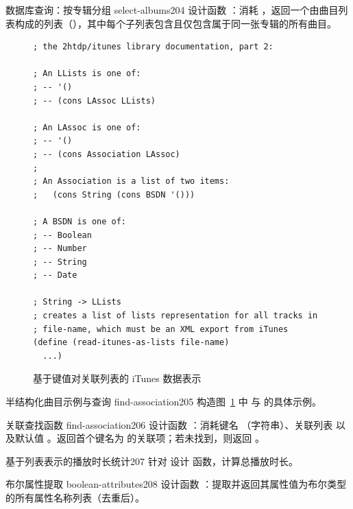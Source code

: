 \begin{exercise}{数据库查询：按专辑分组 select-albums}{204}
设计函数 ：消耗 ，返回一个由曲目列表构成的列表（），其中每个子列表包含且仅包含属于同一张专辑的所有曲目。
\end{exercise}

\begin{figure}[htbp]
  \centering
\begin{lstlisting}[language=BSL, basicstyle=\scriptsize\ttfamily]
; the 2htdp/itunes library documentation, part 2:

; An LLists is one of:
; -- '()
; -- (cons LAssoc LLists)

; An LAssoc is one of:
; -- '()
; -- (cons Association LAssoc)
;
; An Association is a list of two items:
;   (cons String (cons BSDN '()))

; A BSDN is one of:
; -- Boolean
; -- Number
; -- String
; -- Date

; String -> LLists
; creates a list of lists representation for all tracks in
; file-name, which must be an XML export from iTunes
(define (read-itunes-as-lists file-name)
  ...)
\end{lstlisting}
  \caption{基于键值对关联列表的 iTunes 数据表示}
  \label{fig:itunes_lists}
\end{figure}

\begin{exercise}{半结构化曲目示例与查询 find-association}{205}
构造图~\ref{fig:itunes_lists} 中  与  的具体示例。
\end{exercise}

\begin{exercise}{关联查找函数 find-association}{206}
设计函数 ：消耗键名 （字符串）、关联列表  以及默认值 。返回首个键名为  的关联项；若未找到，则返回 。
\end{exercise}

\begin{exercise}{基于列表表示的播放时长统计}{207}
针对  设计  函数，计算总播放时长。
\end{exercise}

\begin{exercise}{布尔属性提取 boolean-attributes}{208}
设计函数 ：提取并返回其属性值为布尔类型的所有属性名称列表（去重后）。
\end{exercise}

